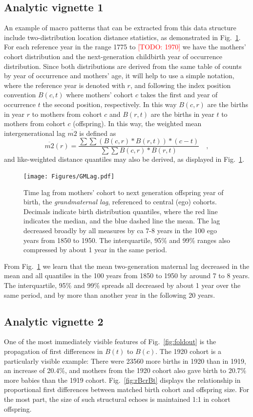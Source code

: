 \documentclass{article}
\newcommand\todo[1]{\textcolor{red}{[TODO: #1]}}
\begin{document}
\subsection{Analytic vignette 1}
An example of macro patterns that can be extracted from this data structure include two-distribution location distance statistics, as demonstrated in Fig.~\ref{fig:gmlag}. For each reference year in the range 1775 to \todo{1970} we have the mothers' cohort distribution and the next-generation childbirth year of occurrence distribution. Since both distributions are derived from the same table of counts by year of occurrence and mothers' age, it will help to use a simple notation, where the reference year is denoted with $r$, and following the index position convention $B(c,t)$ where mothers' cohort $c$ takes the first and year of occurrence $t$ the second position, respectively. In this way $B(c,r)$ are the births in year $r$ to mothers from cohort $c$ and $B(r,t)$ are the births in year $t$ to mothers from cohort $c$ (offspring). In this way, the weighted mean intergenerational lag $\overline{m2}$ is defined as
\begin{equation}
\overline{m2}(r) = \frac{\sum\sum (B(c,r)*B(r,t)) * (c - t)}{\sum\sum B(c,r)*B(r,t)} \quad \mathrm{,}
\end{equation}
and like-weighted distance quantiles may also be derived, as displayed in Fig.~\ref{fig:gmlag}.

\begin{figure}
\texttt{[image: Figures/GMLag.pdf]}
\caption{Time lag from mothers' cohort to next generation offspring year of birth, the \emph{grandmaternal lag}, referenced to central (ego) cohorts. Decimals indicate birth distribution quantiles, where the red line indicates the median, and the blue dashed line the mean. The lag decreased broadly by all measures by ca 7-8 years in the 100 ego years from 1850 to 1950. The interquartile, 95\% and 99\% ranges also compressed by about 1 year in the same period.}
\label{fig:gmlag}
\end{figure}

From Fig.~\ref{fig:gmlag} we learn that the mean two-generation maternal lag decreased in the mean and all quantiles in the 100 years from 1850 to 1950 by around 7 to 8 years. The interquartile, 95\% and 99\% spreads all decreased by about 1 year over the same period, and by more than another year in the following 20 years.

\subsection{Analytic vignette 2}
One of the most immediately visible features of Fig.~\ref{fig:foldout} is the propagation of first differences in $B(t)$ to $B(c)$. The 1920 cohort is a particularly visible example: There were 23560 more births in 1920 than in 1919, an increase of 20.4\%, and mothers from the 1920 cohort also gave birth to 20.7\% more babies than the 1919 cohort. Fig.~\ref{fig:rBcrBt} displays the relationship in proportional first differences between matched birth cohort and offspring size. For the most part, the size of such structural echoes is maintained 1:1 in cohort offspring.
\end{document}
